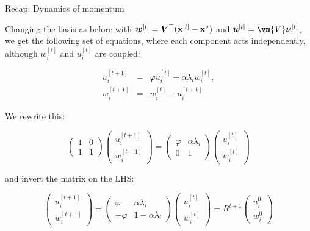 \documentclass[11pt,compress,t,notes=noshow, xcolor=table]{beamer}
\begin{document}
\begin{vbframe}{Recap: Dynamics of momentum}

Changing the basis as before with $\boldsymbol{w}^{[ t ] } = \bm{V}^\top (\mathbf{x}^{[ t ] } - \mathbf{x}^\ast)$ and $\boldsymbol{u}^{[ t ] } = \vm{V} \boldsymbol{\nu}^{[ t ] }$, we get the following set of equations, where each component acts independently, although $w_i^{[ t ] }$ and $u_i^{[ t ] }$ are coupled: 

\begin{eqnarray*}
	u_i^{[ t+1 ] } &=& \varphi u_i^{[ t ] } + \alpha \lambda_i w_i^{[ t ] }, \\
	w_i^{[ t+1 ] } &=& w_i^{[ t ] } - u_i^{[ t+1 ] }
\end{eqnarray*}

We rewrite this: 

\begin{equation*}
\begin{pmatrix}
	1 & 0 \\
	1 & 1 
\end{pmatrix}  \begin{pmatrix}
u_i^{[ t+1 ] } \\
w_i^{[ t+1 ] }
\end{pmatrix} = 
\begin{pmatrix}
	\varphi & \alpha \lambda_i \\
	0 & 1 
\end{pmatrix}  \begin{pmatrix}
	u_i^{[ t ] } \\
	w_i^{[ t ] }
\end{pmatrix}
\end{equation*}

and invert the matrix on the LHS: 

\begin{equation*}
\begin{pmatrix}
		u_i^{[ t+1 ] } \\
		w_i^{[ t+1 ] }
	\end{pmatrix} = 
	\begin{pmatrix}
		\varphi & \alpha \lambda_i \\
		-\varphi & 1 - \alpha \lambda_i
	\end{pmatrix}  \begin{pmatrix}
		u_i^{[ t ] } \\
		w_i^{[ t ] }
	\end{pmatrix} = R^{ t+1 }  \begin{pmatrix}
	u_i^{0} \\
	w_i^{0}
\end{pmatrix}
\end{equation*}


\end{vbframe}
\end{document}
